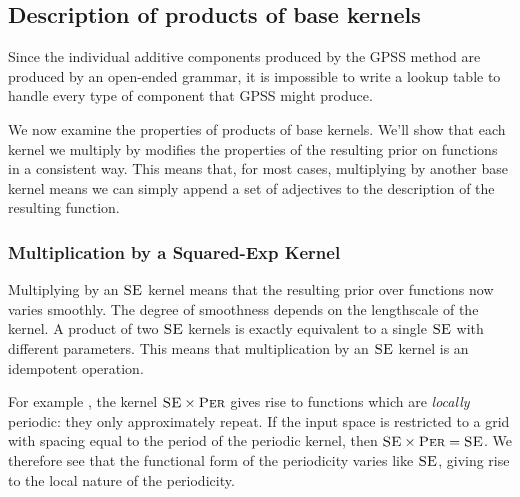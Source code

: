 \documentclass{article} %
\def\ie{i.e.\ }
\begin{document}
\subsection{Description of products of base kernels}
\vspace{-0.1in}

Since the individual additive components produced by the GPSS method are produced by an open-ended grammar, it is impossible to write a lookup table to handle every type of component that GPSS might produce.  



We now examine the properties of products of base kernels.  We'll show that each kernel we multiply by modifies the properties of the resulting prior on functions in a consistent way.  This means that, for most cases, multiplying by another base kernel means we can simply append a set of adjectives to the description of the resulting function.

\subsubsection{Multiplication by a Squared-Exp Kernel}
\vspace{-0.1in}

Multiplying by an ${\textsc{SE}}$ kernel means that the resulting prior over functions now varies smoothly.  The degree of smoothness depends on the lengthscale of the kernel.%
%
A product of two ${\textsc{SE}}$ kernels is exactly equivalent to a single ${\textsc{SE}}$ with different parameters.  This means that multiplication by an ${\textsc{SE}}$ kernel is an idempotent operation.  



For example ,
the kernel ${\textsc{SE}} \times {\textsc{Per}}$ gives rise to functions which are \emph{locally} periodic: they only approximately repeat.
If the input space is restricted to a grid with spacing equal to the period of the periodic kernel, then ${\textsc{SE}} \times {\textsc{Per}} = {\textsc{SE}}$.
We therefore see that the functional form of the periodicity varies like ${\textsc{SE}}$, giving rise to the local nature of the periodicity.

\end{document}
